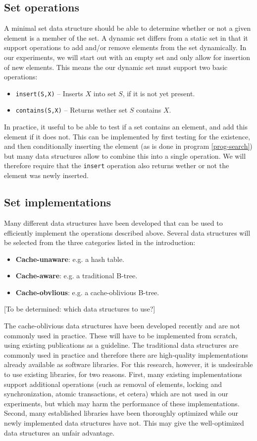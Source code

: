 \documentclass{acm_proc_article-sp}
\begin{document}
\subsection{Set operations}
A minimal set data structure should be able to determine whether or not a given element is a member of the set. A dynamic set differs from a static set in that it support operations to add and/or remove elements from the set dynamically. In our experiments, we will start out with an empty set and only allow for insertion of new elements. This means the our dynamic set must support two basic operations:
\begin{itemize}
\item \verb#insert(S,X)# -- Inserts $X$ into set $S$, if it is not yet present.
\item \verb#contains(S,X)# -- Returns wether set $S$ contains $X$.
\end{itemize}
In practice, it useful to be able to test if a set contains an element, and add this element if it does not. This can be implemented by first testing for the existence, and then conditionally inserting the element (as is done in program \ref{prog-search}) but many data structures allow to combine this into a single operation. We will therefore require that the \verb#insert# operation also returns wether or not the element was newly inserted.

\subsection{Set implementations}
Many different data structures have been developed that can be used to efficiently implement the operations described above. Several data structures will be selected from the three categories listed in the introduction:
\begin{itemize}
\item \textbf{Cache-unaware}: e.g. a hash table.
\item \textbf{Cache-aware}: e.g. a traditional B-tree.
\item \textbf{Cache-obvlious}: e.g. a cache-oblivious B-tree.
\end{itemize}
[To be determined: which data structures to use?]

The cache-oblivious data structures have been developed recently and are not commonly used in practice. These will have to be implemented from scratch, using existing publications as a guideline. The traditional data structures are commonly used in practice and therefore there are high-quality implementations already available as software libraries. For this research, however, it is undesirable to use existing libraries, for two reasons. First, many existing implementations support additional operations (such as removal of elements, locking and synchronization, atomic transactions, et cetera) which are not used in our experiments, but which may harm the performance of these implementations. Second, many established libraries have been thoroughly optimized while our newly implemented data structures have not. This may give the well-optimized data structures an unfair advantage.
\end{document}
